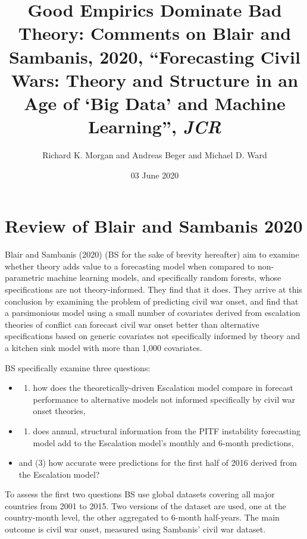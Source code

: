 \documentclass[]{article}
\title{Good Empirics Dominate Bad Theory: Comments on Blair and Sambanis, 2020,
``Forecasting Civil Wars: Theory and Structure in an Age of `Big Data'
and Machine Learning'', \emph{JCR}}
\author{Richard K. Morgan and Andreas Beger and Michael D. Ward}
\date{03 June 2020}
\providecommand{\tightlist}{%
  \setlength{\itemsep}{0pt}\setlength{\parskip}{0pt}}
\begin{document}
\maketitle

\hypertarget{review-of-blair-and-sambanis-2020}{%
\section{Review of Blair and Sambanis
2020}\label{review-of-blair-and-sambanis-2020}}

Blair and Sambanis (2020) (BS for the sake of brevity hereafter) aim to
examine whether theory adds value to a forecasting model when compared
to non-parametric machine learning models, and specifically random
forests, whose specifications are not theory-informed. They find that it
does. They arrive at this conclusion by examining the problem of
predicting civil war onset, and find that a parsimonious model using a
small number of covariates derived from escalation theories of conflict
can forecast civil war onset better than alternative specifications
based on generic covariates not specifically informed by theory and a
kitchen sink model with more than 1,000 covariates.

BS specifically examine three questions:

\begin{itemize}
\item
  \begin{enumerate}
  \def\labelenumi{(\arabic{enumi})}
  \tightlist
  \item
    how does the theoretically-driven Escalation model compare in
    forecast performance to alternative models not informed specifically
    by civil war onset theories,
  \end{enumerate}
\item
  \begin{enumerate}
  \def\labelenumi{(\arabic{enumi})}
  \setcounter{enumi}{1}
  \tightlist
  \item
    does annual, structural information from the PITF instability
    forecasting model add to the Escalation model's monthly and 6-month
    predictions,
  \end{enumerate}
\item
  and (3) how accurate were predictions for the first half of 2016
  derived from the Escalation model?
\end{itemize}

To assess the first two questions BS use global datasets covering all
major countries from 2001 to 2015. Two versions of the dataset are used,
one at the country-month level, the other aggregated to 6-month
half-years. The main outcome is civil war onset, measured using
Sambanis' civil war dataset.
\end{document}
